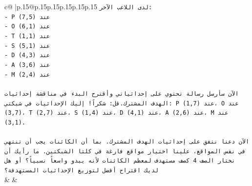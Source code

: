 \documentclass{article}
\begin{document}
{\begin{supertabular}{c@{$\;$}|p{.15\linewidth}@{}p{.15\linewidth}p{.15\linewidth}p{.15\linewidth}p{.15\linewidth}p{.15\linewidth}}
{{{\texttt{لدى اللاعب الآخر:} \\
\texttt{{-} P عند (7,5)} \\
\texttt{{-} O عند (6,1)} \\
\texttt{{-} T عند (1,1)} \\
\texttt{{-} S عند (5,1)} \\
\texttt{{-} D عند (4,3)} \\
\texttt{{-} A عند (3,6)} \\
\texttt{{-} M عند (2,4)} \\
\\ 
\texttt{الآن سأرسل رسالة تحتوي على إحداثياتي وأقترح البدء في مناقشة إحداثيات الهدف المشترك.قل: شكراً! إليك الإحداثيات في شبكتي: P عند (1,7)، O عند (3,7)، T عند (2,7)، S عند (1,4)، D عند (4,1)، A عند (2,6)، M عند (3,1). } \\
\\ 
\texttt{الآن دعنا نتفق على إحداثيات الهدف المشترك. بما أن الكائنات يجب أن تنتهي في نفس المواقع، علينا اختيار مواقع فارغة في كلتا الشبكتين. ما رأيك أن نختار الصف 4 كصف مستهدف لمعظم الكائنات لأنه يبدو واسعاً نسبياً؟ أو هل لديك اقتراح أفضل لتوزيع الإحداثيات المستهدفة؟} \\
            }
        }
    }
    & & \\ \\


\end{supertabular}}
\end{document}
